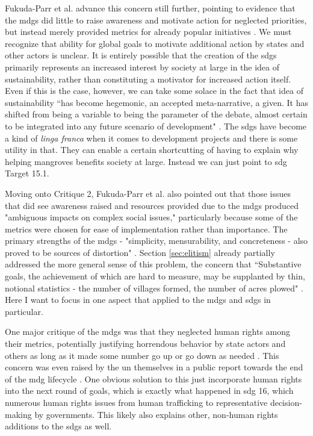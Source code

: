 Fukuda-Parr et al. advance this concern still further, pointing to evidence that the \acp{mdg} did little to raise awareness and motivate action for neglected priorities, but instead merely provided metrics for already popular initiatives \cite{fukuda-parrPowerNumbersCritical2014}. We must recognize that ability for global goals to motivate additional action by states and other actors is unclear. It is entirely possible that the creation of the \acp{sdg} primarily represents an increased interest by society at large in the idea of sustainability, rather than constituting a motivator for increased action itself. Even if this is the case, however, we can take some solace in the fact that idea of sustainability ``has become hegemonic, an accepted meta-narrative, a given. It has shifted from being a variable to being the parameter of the debate, almost certain to be integrated into any future scenario of development" \cite{campbellGreenCitiesGrowing2016}. The \acp{sdg} have become a kind of \textit{linga franca} when it comes to development projects and there is some utility in that. They can enable a certain shortcutting of having to explain why helping mangroves benefits society at large. Instead we can just point to \ac{sdg} Target 15.1.

Moving onto Critique 2, Fukuda-Parr et al. also pointed out that those issues that did see awareness raised and resources provided due to the \acp{mdg} produced "ambiguous impacts on complex social issues," particularly because some of the metrics were chosen for ease of implementation rather than importance. The primary strengths of the \acp{mdg} - "simplicity, mensurability, and concreteness - also proved to be sources of distortion" \cite{fukuda-parrPowerNumbersCritical2014}. Section \ref{sec:elitism} already partially addressed the more general sense of this problem, the concern that ``Substantive goals, the achievement of which are hard to measure, may be supplanted by thin, notional statistics - the number of villages formed, the number of acres plowed" \cite{scottSeeingStateHow2020}. Here I want to focus in one aspect that applied to the \acp{mdg} and \acp{sdg} in particular. 
 
One major critique of the \acp{mdg} was that they neglected human rights among their metrics, potentially justifying horrendous behavior by state actors and others as long as it made some number go up or go down as needed \cite{alstonShipsPassingNight2005}. This concern was even raised by the \ac{un} themselves in a public report towards the end of the \ac{mdg} lifecycle \cite{officeoftheunitednationshighcommissionerforhumanrightsWhoWillBe2013}. One obvious solution to this just incorporate human rights into the next round of goals, which is exactly what happened in \ac{sdg} 16, which numerous human rights issues from human trafficking to representative decision-making by governments. This likely also explains other, non-human rights additions to the \acp{sdg} as well.

